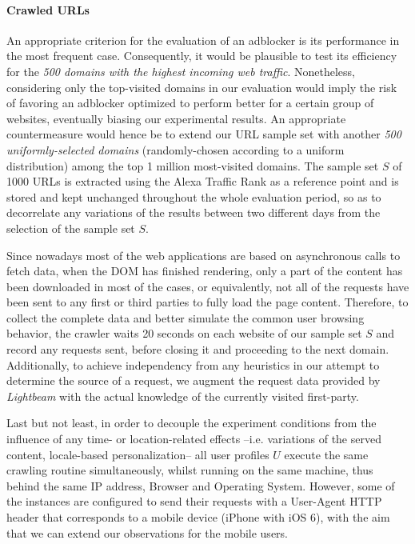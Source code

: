 \documentclass{sig-alternate}
\begin{document}
\paragraph{Crawled URLs}
\label{sec:crawled_urls}
An appropriate criterion for the evaluation of an adblocker is its performance in the most frequent case. Consequently, it would be plausible to test its efficiency for the \textit{500 domains with the highest incoming web traffic}. Nonetheless, considering only the top-visited domains in our evaluation would imply the risk of favoring an adblocker optimized to perform better for a certain group of websites, eventually biasing our experimental results. An appropriate countermeasure would hence be to extend our URL sample set with another \textit{500 uniformly-selected domains} {\color{blue}(randomly-chosen according to a uniform distribution)} among the top 1 million most-visited domains. The sample set $S$ of 1000 URLs is extracted using the Alexa Traffic Rank as a reference point and is stored and kept unchanged throughout the whole evaluation period, so as to decorrelate any variations of the results between two different days from the selection of the sample set $S$.

Since nowadays most of the web applications are based on asynchronous calls to fetch data, when the DOM has finished rendering, only a part of the content has been downloaded in most of the cases, or equivalently, not all of the requests have been sent to any first or third parties to fully load the page content. Therefore, to collect the complete data and better simulate the common user browsing behavior, the crawler waits 20 seconds on each website of our sample set $S$ and record any requests sent, before closing it and proceeding to the next domain. Additionally, to achieve independency from any heuristics in our attempt to determine the source of a request, we augment the request data provided by \textit{Lightbeam} with the actual knowledge of the currently visited first-party.

Last but not least, in order to decouple the experiment conditions from the influence of any time- or location-related effects --i.e. variations of the served content, locale-based personalization-- all user profiles $U$ execute the same crawling routine simultaneously, whilst running on the same machine, thus behind the same IP address, Browser and Operating System. However, some of the instances are configured to send their requests with a User-Agent HTTP header that corresponds to a mobile device (iPhone with iOS 6), with the aim that we can extend our observations for the mobile users.
\end{document}
